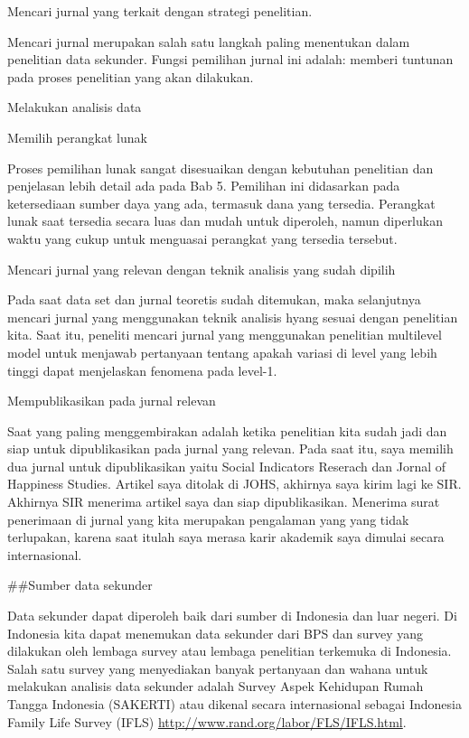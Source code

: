 \documentclass[
]{book}
\begin{document}
Mencari jurnal yang terkait dengan strategi penelitian.

Mencari jurnal merupakan salah satu langkah paling menentukan dalam penelitian data sekunder. Fungsi pemilihan jurnal ini adalah: memberi tuntunan pada proses penelitian yang akan dilakukan.

Melakukan analisis data

Memilih perangkat lunak

Proses pemilihan lunak sangat disesuaikan dengan kebutuhan penelitian dan penjelasan lebih detail ada pada Bab 5. Pemilihan ini didasarkan pada ketersediaan sumber daya yang ada, termasuk dana yang tersedia. Perangkat lunak saat tersedia secara luas dan mudah untuk diperoleh, namun diperlukan waktu yang cukup untuk menguasai perangkat yang tersedia tersebut.

Mencari jurnal yang relevan dengan teknik analisis yang sudah dipilih

Pada saat data set dan jurnal teoretis sudah ditemukan, maka selanjutnya mencari jurnal yang menggunakan teknik analisis hyang sesuai dengan penelitian kita. Saat itu, peneliti mencari jurnal yang menggunakan penelitian multilevel model untuk menjawab pertanyaan tentang apakah variasi di level yang lebih tinggi dapat menjelaskan fenomena pada level-1.

Mempublikasikan pada jurnal relevan

Saat yang paling menggembirakan adalah ketika penelitian kita sudah jadi dan siap untuk dipublikasikan pada jurnal yang relevan. Pada saat itu, saya memilih dua jurnal untuk dipublikasikan yaitu Social Indicators Reserach dan Jornal of Happiness Studies. Artikel saya ditolak di JOHS, akhirnya saya kirim lagi ke SIR. Akhirnya SIR menerima artikel saya dan siap dipublikasikan. Menerima surat penerimaan di jurnal yang kita merupakan pengalaman yang yang tidak terlupakan, karena saat itulah saya merasa karir akademik saya dimulai secara internasional.

\#\#Sumber data sekunder

Data sekunder dapat diperoleh baik dari sumber di Indonesia dan luar negeri. Di Indonesia kita dapat menemukan data sekunder dari BPS dan survey yang dilakukan oleh lembaga survey atau lembaga penelitian terkemuka di Indonesia. Salah satu survey yang menyediakan banyak pertanyaan dan wahana untuk melakukan analisis data sekunder adalah Survey Aspek Kehidupan Rumah Tangga Indonesia (SAKERTI) atau dikenal secara internasional sebagai Indonesia Family Life Survey (IFLS) \url{http://www.rand.org/labor/FLS/IFLS.html}.
\end{document}
